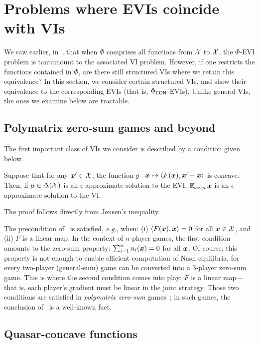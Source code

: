 \section{Problems where EVIs coincide with VIs}

We saw earlier, in~, that when $\Phi$ comprises all functions from ${\mathcal{X}}$ to ${\mathcal{X}}$, the $\Phi$-EVI problem is tantamount to the associated VI problem. However, if one restricts the functions contained in $\Phi$, are there still structured VIs where we retain this equivalence? 
In this section, we consider certain structured VIs, and show their equivalence to the corresponding EVIs (that is, $\Phi_\mathsf{CON}$-EVIs). Unlike general VIs, the ones we examine below are tractable.%


\subsection{Polymatrix zero-sum games and beyond}

The first important class of VIs we consider is described by a condition given below.

\begin{proposition}
    \label{prop:collapse}
    Suppose that for any ${\bm{x}}' \in {\mathcal{X}}$, the function $g : {\bm{x}} \mapsto \langle F({\bm{x}}), {\bm{x}}' - {\bm{x}} \rangle$ is concave. Then, if $\mu \in \Delta({\mathcal{X}})$ is an $\epsilon$-approximate solution to the EVI, $\operatorname*{\mathbb E}_{{\bm{x}} \sim \mu} {\bm{x}}$ is an $\epsilon$-approximate solution to the VI.
\end{proposition}

The proof follows directly from Jensen's inequality.

The precondition of~ is satisfied, \emph{e.g.}, when: (i) $\langle F({\bm{x}}), {\bm{x}} \rangle = 0$ for all ${\bm{x}} \in {\mathcal{X}}$, and (ii) $F$ is a linear map. In the context of $n$-player games, the first condition amounts to the zero-sum property: $\sum_{i=1}^n u_i({\bm{x}}) = 0$ for all ${\bm{x}}$. Of course, this property is not enough to enable efficient computation of Nash equilibria, for every two-player (general-sum) game can be converted into a $3$-player zero-sum game. This is where the second condition comes into play: $F$ is a linear map---that is, each player's gradient must be linear in the joint strategy. Those two conditions are satisfied in \emph{polymatrix zero-sum} games~\citep{Cai16:Zero}; in such games, the conclusion of~ is a well-known fact. 

\subsection{Quasar-concave functions}

